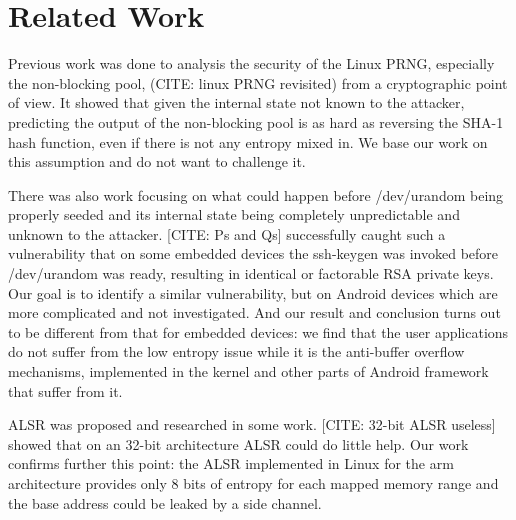 \section{Related Work}


Previous work was done to analysis the security of the Linux PRNG, especially the non-blocking pool, (CITE: linux PRNG revisited) from a cryptographic point of view. It showed that given the internal state not known to the attacker, predicting the output of the non-blocking pool is as hard as reversing the SHA-1 hash function, even if there is not any entropy mixed in. We base our work on this assumption and do not want to challenge it. 

There was also work focusing on what could happen before /dev/urandom being properly seeded and its internal state being completely unpredictable and unknown to the attacker. [CITE: Ps and Qs] successfully caught such a vulnerability that on some embedded devices the ssh-keygen was invoked before /dev/urandom was ready, resulting in identical or factorable RSA private keys. Our goal is to identify a similar vulnerability, but on Android devices which are more complicated and not investigated. And our result and conclusion turns out to be different from that for embedded devices: we find that the user applications do not suffer from the low entropy issue while it is the anti-buffer overflow mechanisms, implemented in the kernel and other parts of Android framework that suffer from it.

ALSR was proposed and researched in some work. [CITE: 32-bit ALSR useless] showed that on an 32-bit architecture ALSR could do little help. Our work confirms further this point: the ALSR implemented in Linux for the arm architecture provides only 8 bits of entropy for each mapped memory range and the base address could be leaked by a side channel.


